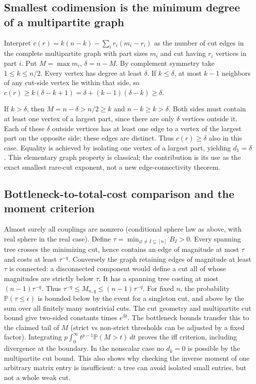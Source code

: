 \documentclass[11pt]{article}
\begin{document}
\subsection{Smallest codimension is the minimum degree of a multipartite graph}\label{smallest-codimension-is-the-minimum-degree-of-a-multipartite-graph}

Interpret \(c(r)=k(n-k)-\sum_i r_i(m_i-r_i)\) as the number of cut edges in the complete multipartite graph with part sizes \(m_i\) and cut having \(r_i\) vertices in part \(i\). Put \(M=\max m_i\), \(\delta=n-M\). By complement symmetry take \(1\le k\le n/2\). Every vertex has degree at least \(\delta\). If \(k\le\delta\), at most \(k-1\) neighbors of any cut-side vertex lie within that side, so \(c(r)\ge k(\delta-k+1)=\delta+(k-1)(\delta-k)\ge\delta\).

If \(k>\delta\), then \(M=n-\delta>n/2\ge k\) and \(n-k\ge k>\delta\). Both sides must contain at least one vertex of a largest part, since there are only \(\delta\) vertices outside it. Each of these \(\delta\) outside vertices has at least one edge to a vertex of the largest part on the opposite side; these edges are distinct. Thus \(c(r)\ge\delta\) also in this case. Equality is achieved by isolating one vertex of a largest part, yielding \(d_1=\delta\). This elementary graph property is classical; the contribution is its use as the exact smallest rare-cut exponent, not a new edge-connectivity theorem.

\subsection{Bottleneck-to-total-cost comparison and the moment criterion}\label{bottleneck-to-total-cost-comparison-and-the-moment-criterion}

Almost surely all couplings are nonzero (conditional sphere law as above, with real sphere in the real case). Define \(\tau=\min_{\varnothing\ne I\subsetneq[n]} B_I>0\). Every spanning tree crosses the minimizing cut, hence contains an edge of magnitude at most \(\tau\) and costs at least \(\tau^{-q}\). Conversely the graph retaining edges of magnitude at least \(\tau\) is connected: a disconnected component would define a cut all of whose magnitudes are strictly below \(\tau\). It has a spanning tree costing at most \((n-1)\tau^{-q}\). Thus \(\tau^{-q}\le M_{n,q}\le(n-1)\tau^{-q}\). For fixed \(n\), the probability \(\mathbb P(\tau\le\epsilon)\) is bounded below by the event for a singleton cut, and above by the sum over all finitely many nontrivial cuts. The cut geometry and multipartite cut bound give two-sided constants times \(\epsilon^{\beta\delta}\). The bottleneck bounds transfer this to the claimed tail of \(M\) (strict vs non-strict thresholds can be adjusted by a fixed factor). Integrating \(p\int_0^\infty t^{p-1}\mathbb P(M>t)\,dt\) proves the iff criterion, including divergence at the boundary. In the nonscalar case no \(d_k=0\) is possible by the multipartite cut bound. This also shows why checking the inverse moment of one arbitrary matrix entry is insufficient: a tree can avoid isolated small entries, but not a whole weak cut.
\end{document}
